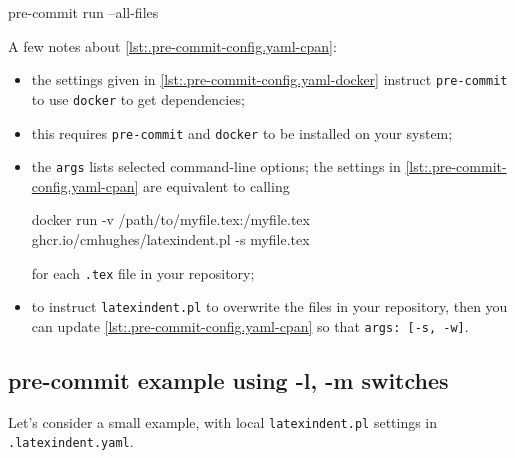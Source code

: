   \begin{commandshell}
pre-commit run --all-files
\end{commandshell}

  A few notes about \cref{lst:.pre-commit-config.yaml-cpan}:
  \begin{itemize}
   \item the settings given in \cref{lst:.pre-commit-config.yaml-docker} instruct
         \texttt{pre-commit} to use \texttt{docker} to get dependencies;
   \item this requires \texttt{pre-commit} and \texttt{docker} to be installed on your
         system;
   \item the \texttt{args} lists selected command-line options; the settings in
         \cref{lst:.pre-commit-config.yaml-cpan} are equivalent to calling

         \begin{commandshell}
docker run -v /path/to/myfile.tex:/myfile.tex ghcr.io/cmhughes/latexindent.pl -s myfile.tex
\end{commandshell}

         for each \texttt{.tex} file in your repository;
   \item to instruct \texttt{latexindent.pl} to overwrite the files in your repository,
         then you can update \cref{lst:.pre-commit-config.yaml-cpan} so that
         \texttt{args: [-s, -w]}.
  \end{itemize}

 \subsection{pre-commit example using -l, -m switches}
  Let's consider a small example, with local \texttt{latexindent.pl} settings in
  \texttt{.latexindent.yaml}.

